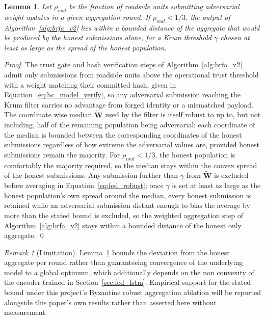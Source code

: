 \documentclass[final,5p,twocolumn]{elsarticle}
\newtheorem{lemma}{Lemma}
\theoremstyle{remark}
\newtheorem{remark}{Remark}
\theoremstyle{plain}
\begin{document}
\begin{lemma}
	\label{lem:convergence}
	Let $\rho_{mal}$ be the fraction of roadside units submitting
	adversarial weight updates in a given aggregation round. If
	$\rho_{mal} < 1/3$, the output of Algorithm~\ref{alg:brfa_v2} lies
	within a bounded distance of the aggregate that would be produced by
	the honest submissions alone, for a Krum threshold $\gamma$ chosen at
	least as large as the spread of the honest population.
\end{lemma}
\begin{proof}
	The trust gate and hash verification steps of Algorithm~\ref{alg:brfa_v2}
	admit only submissions from roadside units above the operational trust
	threshold with a weight matching their committed hash, given in
	Equation~\eqref{eq:bc_model_verify}, so any adversarial submission
	reaching the Krum filter carries no advantage from forged identity or
	a mismatched payload. The coordinate wise median $\tilde{\mathbf{W}}$
	used by the filter is itself robust to up to, but not including, half
	of the remaining population being adversarial: each coordinate of the
	median is bounded between the corresponding coordinates of the
	honest submissions regardless of how extreme the adversarial values
	are, provided honest submissions remain the majority. For
	$\rho_{mal}<1/3$, the honest population is comfortably the majority
	required, so the median stays within the convex spread of the honest
	submissions. Any submission further than $\gamma$ from
	$\tilde{\mathbf{W}}$ is excluded before averaging in
	Equation~\eqref{eq:fed_robust}; once $\gamma$ is set at least as large
	as the honest population's own spread around the median, every honest
	submission is retained while an adversarial submission distant enough
	to bias the average by more than the stated bound is excluded, so the
	weighted aggregation step of Algorithm~\ref{alg:brfa_v2} stays within
	a bounded distance of the honest only aggregate.
	\qed
\end{proof}

\begin{remark}[Limitation]
	Lemma~\ref{lem:convergence} bounds the deviation from the honest
	aggregate per round rather than guaranteeing convergence of the
	underlying model to a global optimum, which additionally depends on
	the non convexity of the encoder trained in
	Section~\ref{sec:fed_lstm}. Empirical support for the stated bound
	under this project's Byzantine robust aggregation ablation will be
	reported alongside this paper's own results rather than asserted here
	without measurement.
\end{remark}
\end{document}
